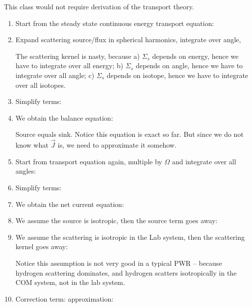 \documentclass{school-22.211-notes}
\date{March 19, 2012}
\begin{document}
\maketitle

This class would not require derivation of the transport theory. 
\begin{enumerate}
\item Start from the steady state continuous energy transport equation: 

\item Expand scattering source/flux in spherical harmonics, integrate over angle,


The scattering kernel is nasty, because a) $\Sigma_s$ depends on energy, hence we have to integrate over all energy; b) $\Sigma_s$ depends on angle, hence we have to integrate over all angle; c) $\Sigma_s$ depends on isotope, hence we have to integrate over all isotopes. 

\item Simplify terms: 


\item We obtain the balance equation:

Source equals sink. Notice this equation is exact so far. But since we do not know what $\vec{J}$ is, we need to approximate it somehow. 

\item Start from transport equation again, multiple by $\Omega$ and integrate over all angles: 


\item Simplify terms:



\item We obtain the net current equation:


\item We assume the source is isotropic, then the source term goes away:

\item We assume the scattering is isotropic in the Lab system, then the scattering kernel goes away:


Notice this assumption is not very good in a typical PWR -- because hydrogen scattering dominates, and hydrogen scatters isotropically in the COM system, not in the lab system. 

\item Correction term:  approximation: 

\end{enumerate}
\end{document}
